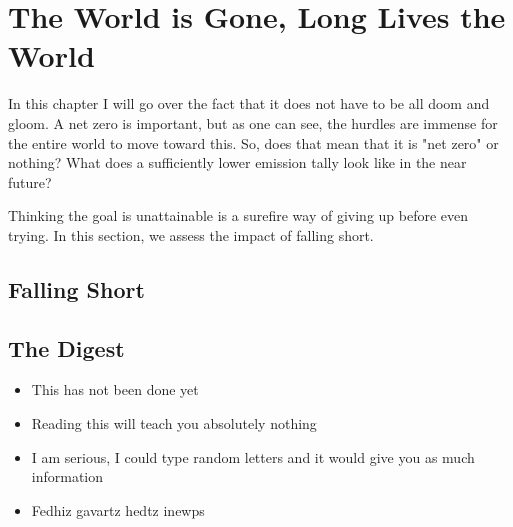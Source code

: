 \setchapterpreamble[u]{\margintoc}
\chapter{The World is Gone, Long Lives the World}

In this chapter I will go over the fact that it does not have to be all doom and gloom. A net zero is important, but as one can see, the hurdles are immense for the entire world to move toward this. So, does that mean that it is "net zero" or nothing? What does a sufficiently lower emission tally look like in the near future?

Thinking the goal is unattainable is a surefire way of giving up before even trying. In this section, we assess the impact of falling short.

\section{Falling Short}

\blindtext


\section{The Digest}


\begin{kaoboxgreen}[frametitle=Main Takeaways]

\begin{itemize}
\item This has not been done yet
\item Reading this will teach you absolutely nothing
\item I am serious, I could type random letters and it would give you as much information
\item Fedhiz gavartz hedtz inewps
\end{itemize}
  
\end{kaoboxgreen}